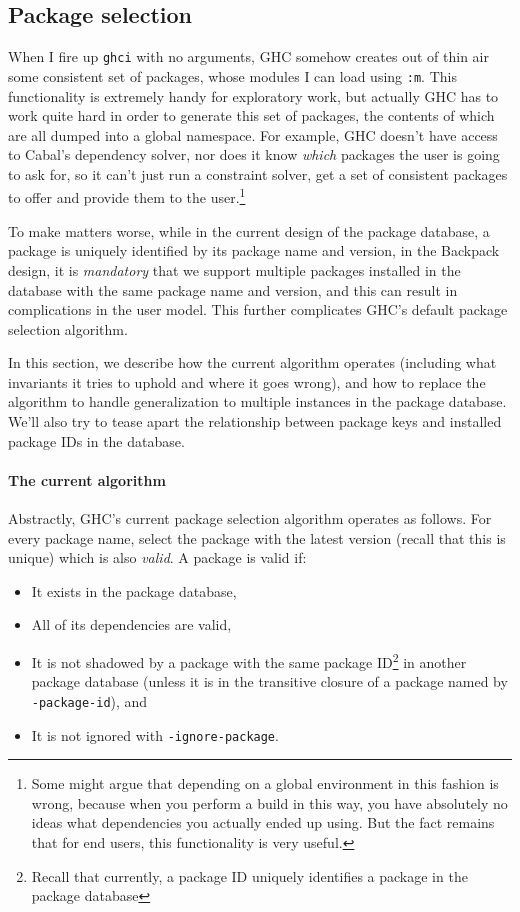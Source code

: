 \documentclass{article}
\begin{document}
\subsection{Package selection}

When I fire up \texttt{ghci} with no arguments, GHC somehow creates
out of thin air some consistent set of packages, whose modules I can
load using \texttt{:m}.  This functionality is extremely handy for
exploratory work, but actually GHC has to work quite hard in order
to generate this set of packages, the contents of which are all
dumped into a global namespace.  For example, GHC doesn't have access
to Cabal's dependency solver, nor does it know \emph{which} packages
the user is going to ask for, so it can't just run a constraint solver,
get a set of consistent packages to offer and provide them to the user.\footnote{Some might
argue that depending on a global environment in this fashion is wrong, because
when you perform a build in this way, you have absolutely no ideas what
dependencies you actually ended up using.  But the fact remains that for
end users, this functionality is very useful.}

To make matters worse, while in the current design of the package database,
a package is uniquely identified by its package name and version, in
the Backpack design, it is \emph{mandatory} that we support multiple
packages installed in the database with the same package name and version,
and this can result in complications in the user model.  This further
complicates GHC's default package selection algorithm.

In this section, we describe how the current algorithm operates (including
what invariants it tries to uphold and where it goes wrong), and how
to replace the algorithm to handle generalization to
multiple instances in the package database.  We'll also try to tease
apart the relationship between package keys and installed package IDs in
the database.

\paragraph{The current algorithm} Abstractly, GHC's current package
selection algorithm operates as follows.  For every package name, select
the package with the latest version (recall that this is unique) which
is also \emph{valid}.  A package is valid if:

\begin{itemize}
    \item It exists in the package database,
    \item All of its dependencies are valid,
    \item It is not shadowed by a package with the same package ID\footnote{Recall that currently, a package ID uniquely identifies a package in the package database} in
        another package database (unless it is in the transitive closure
        of a package named by \texttt{-package-id}), and
    \item It is not ignored with \texttt{-ignore-package}.
\end{itemize}
\end{document}

